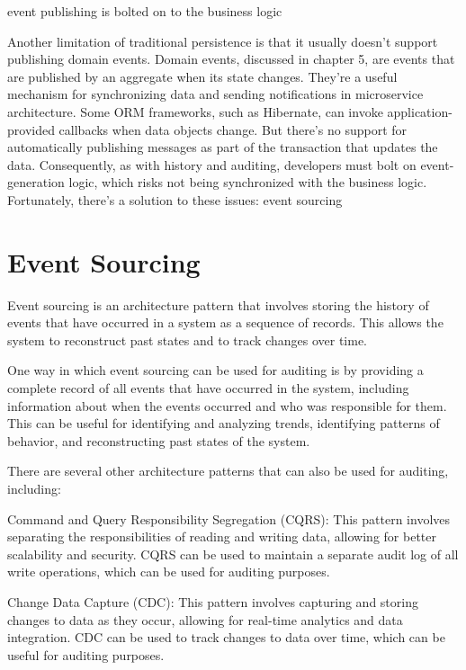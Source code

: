 event publishing is bolted on to the business logic

Another limitation of traditional persistence is that it usually doesn’t support publishing
domain events. Domain events, discussed in chapter 5, are events that are published by
an aggregate when its state changes. They’re a useful mechanism for synchronizing data
and sending notifications in microservice architecture. Some ORM frameworks, such
as Hibernate, can invoke application-provided callbacks when data objects change.
But there’s no support for automatically publishing messages as part of the transaction that updates the data. Consequently, as with history and auditing, developers
must bolt on event-generation logic, which risks not being synchronized with the business logic. Fortunately, there’s a solution to these issues: event sourcing

\section{Event Sourcing}


Event sourcing is an architecture pattern that involves storing the history of events that have occurred in a system as a sequence of records. This allows the system to reconstruct past states and to track changes over time.

One way in which event sourcing can be used for auditing is by providing a complete record of all events that have occurred in the system, including information about when the events occurred and who was responsible for them. This can be useful for identifying and analyzing trends, identifying patterns of behavior, and reconstructing past states of the system.

There are several other architecture patterns that can also be used for auditing, including:

Command and Query Responsibility Segregation (CQRS): This pattern involves separating the responsibilities of reading and writing data, allowing for better scalability and security. CQRS can be used to maintain a separate audit log of all write operations, which can be used for auditing purposes.

Change Data Capture (CDC): This pattern involves capturing and storing changes to data as they occur, allowing for real-time analytics and data integration. CDC can be used to track changes to data over time, which can be useful for auditing purposes.

